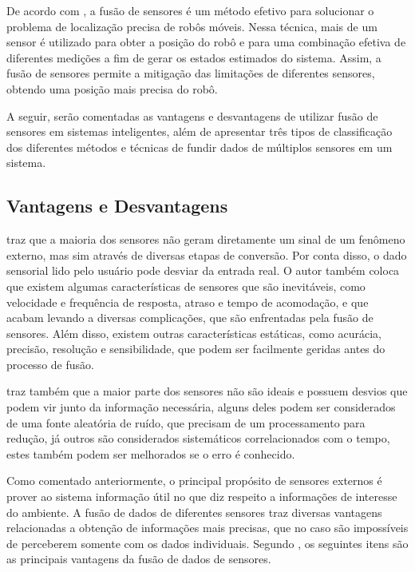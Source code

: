 \documentclass[acronym, symbols]{fei}
\begin{document}
		De acordo com \textcite{marton2013two}, a fusão de sensores é um método efetivo para solucionar o problema de localização precisa de robôs móveis. Nessa técnica, mais de um sensor é utilizado para obter a posição do robô e para uma combinação efetiva de diferentes medições a fim de gerar os estados estimados do sistema. Assim, a fusão de sensores permite a mitigação das limitações de diferentes sensores, obtendo uma posição mais precisa do robô.
		
		A seguir, serão comentadas as vantagens e desvantagens de utilizar fusão de sensores em sistemas inteligentes, além de apresentar três tipos de classificação dos diferentes métodos e técnicas de fundir dados de múltiplos sensores em um sistema.
		
		\subsection{Vantagens e Desvantagens}
		
			\textcite{fung2017sensor} traz que a maioria dos sensores não geram diretamente um sinal de um fenômeno externo, mas sim através de diversas etapas de conversão. Por conta disso, o dado sensorial lido pelo usuário pode desviar da entrada real. O autor também coloca que existem algumas características de sensores que são inevitáveis, como velocidade e frequência de resposta, atraso e tempo de acomodação, e que acabam levando a diversas complicações, que são enfrentadas pela fusão de sensores. Além disso, existem outras características estáticas, como acurácia, precisão, resolução e sensibilidade, que podem ser facilmente geridas antes do processo de fusão.
			
			\textcite{fung2017sensor} traz também que a maior parte dos sensores não são ideais e possuem desvios que podem vir junto da informação necessária, alguns deles podem ser considerados de uma fonte aleatória de ruído, que precisam de um processamento para redução, já outros são considerados sistemáticos correlacionados com o tempo, estes também podem ser melhorados se o erro é conhecido.
			
			Como comentado anteriormente, o principal propósito de sensores externos é prover ao sistema informação útil no que diz respeito a informações de interesse do ambiente. A fusão de dados de diferentes sensores traz diversas vantagens relacionadas a obtenção de informações mais precisas, que no caso são impossíveis de perceberem somente com os dados individuais. Segundo \textcite{alatise2020review}, os seguintes itens são as principais vantagens da fusão de dados de sensores.
			
\end{document}
